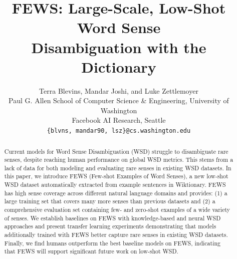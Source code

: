 \documentclass[11pt,a4paper]{article}
\title{FEWS: Large-Scale, Low-Shot Word Sense\\ Disambiguation with the Dictionary}
\author{Terra Blevins, Mandar Joshi, and Luke Zettlemoyer \\
        Paul G. Allen School of Computer Science \& Engineering, University of Washington \\
        Facebook AI Research, Seattle \\
        {\tt \{blvns, mandar90, lsz\}@cs.washington.edu}}
\date{}
\begin{document}
\maketitle
\begin{abstract}
Current models for Word Sense Disambiguation (WSD) struggle to disambiguate rare senses, despite reaching human performance on global WSD metrics. This stems from a lack of data for both modeling and evaluating rare senses in existing WSD datasets. In this paper, we introduce FEWS (Few-shot Examples of Word Senses), a new low-shot WSD dataset automatically extracted from example sentences in Wiktionary. FEWS has high sense coverage across different natural language domains and provides: (1) a large training set that covers many more senses than previous datasets and (2) a comprehensive evaluation set containing few- and zero-shot examples of a wide variety of senses. We establish baselines on FEWS with knowledge-based and neural WSD approaches and present transfer learning experiments demonstrating that models additionally trained with FEWS better capture rare senses in existing WSD datasets. Finally, we find humans outperform the best baseline models on FEWS, indicating that FEWS will support significant future work on low-shot WSD.
\end{abstract}
\end{document}
